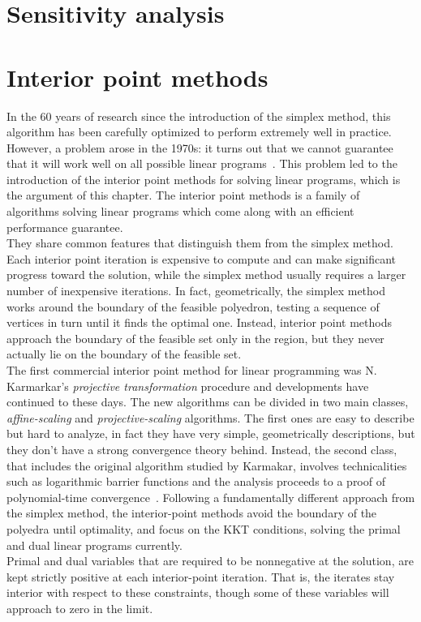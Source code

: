 \documentclass[a4paper,10 pt,titlepage,twoside]{book}
\theoremstyle{plain}
\theoremstyle{definition}
\theoremstyle{remark}
\begin{document}
\chapter{Sensitivity analysis}

\chapter{Interior point methods}
In the 60 years of research since the introduction of the simplex method, this algorithm has been carefully optimized to perform extremely well in practice. However, a problem arose in the 1970s: it turns out that we cannot guarantee that it will work well on all possible linear programs~\cite{3}.
This problem led to the introduction of the interior point methods for solving linear programs, which is the argument of this chapter. The interior point methods is a family of algorithms solving linear programs which come along with an efficient performance guarantee.\\
They share common features that distinguish them from the simplex method. Each interior point iteration is expensive to compute and can make significant progress toward the solution, while the simplex method usually requires a larger number of inexpensive iterations. In fact, geometrically, the simplex method works around the boundary of the feasible polyedron, testing a sequence of vertices in turn until it finds the optimal one. Instead, interior point methods approach the boundary of the feasible set only in the region, but they never actually lie on the boundary of the feasible set.\\
The first commercial interior point method for linear programming was N. Karmarkar's \textit{projective transformation} procedure and developments have continued to these days. The new algorithms can be divided in two main classes, \textit{affine-scaling} and \textit{projective-scaling} algorithms.
The first ones are easy to describe but hard to analyze, in fact they have very simple, geometrically descriptions, but they don't have a strong convergence theory behind.
Instead, the second class, that includes the original algorithm studied by Karmakar, involves technicalities such as logarithmic barrier functions and the analysis proceeds to a proof of polynomial-time convergence~\cite{4}. 
\newpage
Following a fundamentally different approach from the simplex method, the interior-point methods avoid the boundary of the polyedra until optimality, and focus on the KKT conditions, solving the primal and dual linear programs currently.\\ Primal and dual variables that are required to be nonnegative at the solution, are kept strictly positive at each interior-point iteration. That is, the iterates stay interior with respect to these constraints, though some of these variables will approach to zero in the limit.
\end{document}
